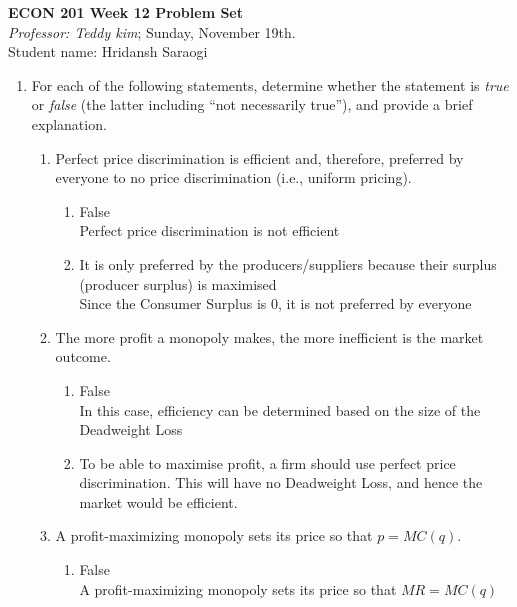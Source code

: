 \documentclass[11pt]{article}
\begin{document}
\begin{center}
\textbf{ECON 201 Week 12 Problem Set}\\
\textit {Professor: Teddy kim};  
Sunday, November 19th.
\\Student name: Hridansh Saraogi
\end{center}

\begin{enumerate}
\item For each of the following statements, determine whether
the statement is \emph{true} or \emph{false} (the latter including ``not necessarily true''), and provide a brief explanation.
    \begin{enumerate}
    \item Perfect price discrimination is efficient and, therefore, preferred by everyone to no price discrimination (i.e., uniform pricing).
    \begin{enumerate}
        \item False\\
        Perfect price discrimination is not efficient
        \item It is only preferred by the producers/suppliers because their surplus (producer surplus) is maximised\\Since the Consumer Surplus is 0, it is not preferred by everyone
    \end{enumerate}
	
	\item The more profit a monopoly makes, the more inefficient is the market outcome.
	\begin{enumerate}
        \item False\\
        In this case, efficiency can be determined based on the size of the Deadweight Loss
        \item To be able to maximise profit, a firm should use perfect price discrimination. This will have no Deadweight Loss, and hence the market would be efficient.
    \end{enumerate}
	

	\item A profit-maximizing monopoly sets its price so that $p=MC(q)$.
	\begin{enumerate}
        \item False\\
        A profit-maximizing monopoly sets its price so that $MR=MC(q)$
    \end{enumerate}
	

\end{enumerate}
\end{enumerate}
\end{document}
